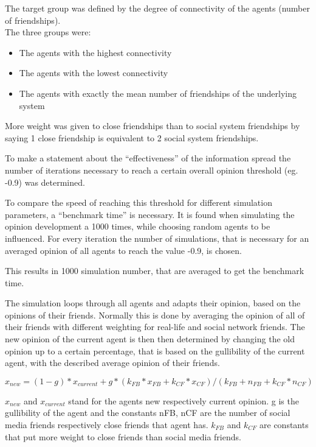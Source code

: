 \documentclass[11pt]{article}
\begin{document}
The target group was defined by the degree of connectivity of the agents (number of friendships). 
\\ 

The three groups were:

\begin{itemize}
\item The agents with the highest connectivity
\item The agents with the lowest connectivity
\item The agents with exactly the mean number of friendships of the underlying system
\end{itemize}

More weight was given to close friendships than to social system friendships by saying 1 close friendship is equivalent to 2 social system friendships. 

To make a statement about the “effectiveness” of the information spread the number of iterations necessary to reach a certain overall opinion threshold (eg. -0.9) was determined. 

To compare the speed of reaching this threshold for different simulation parameters, a “benchmark time” is necessary. It is found when simulating the opinion development a 1000 times, while choosing random agents to be influenced. For every iteration the number of simulations, that is necessary for an averaged opinion of all agents to reach the value -0.9,  is chosen.

This results in 1000 simulation number, that are averaged to get the benchmark time. 

The simulation loops through all agents and adapts their opinion, based on the opinions of their friends. Normally this is done by averaging the opinion of all of their friends with different weighting for real-life and social network friends. The new opinion of the current agent is then then determined by changing the old opinion up to a certain percentage, that is based on the gullibility of the current agent, with the described average opinion of their friends.

\begin{equation*}
x_{new} = (1-g) * x_{current} + g * (k_{FB} *x_{FB} + k_{CF} * x_{CF}) / (k_{FB} +n_{FB} +k_{CF} *n_{CF})
\end{equation*}



$x_{new}$ and $x_{current}$ stand for the agents new respectively current opinion. g is the gullibility of the agent and the constants nFB, nCF are the number of social media friends respectively close friends that agent has. $k_{FB}$ and $k_{CF}$ are constants that put more weight to close friends than social media friends.  
\end{document}
